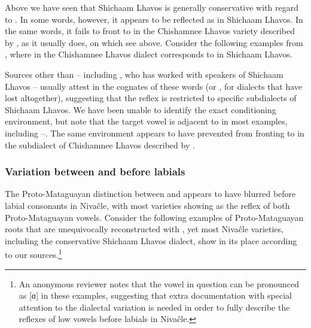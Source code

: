 Above we have seen that Shichaam Lhavos is generally conservative with regard to . In some words, however, it appears to be reflected as  in Shichaam Lhavos. In the same words, it fails to front to  in the Chishamnee Lhavos variety described by \citet{NS87}, as it usually does, on which see  above. Consider the following examples from \citep[498, 504, 514, 517, 521]{NS87}, where  in the Chishamnee Lhavos dialect corresponds to  in Shichaam Lhavos.

\ea
    \begin{xlist}
        \ex {} \recind {} \label{vatcôjôyjayash}
        \ex {} \recind {}
        \ex {} \recind {}
        \ex {} \recind {}
        \ex {} \recind {} \label{chiyô'ji}
        \ex {} \recind {}
        \ex {} \recind {}
        \ex {} \recind {}
    \end{xlist}
\z
{}

Sources other than \citet{NS87} -- including \citet{AnG15}, who has worked with speakers of Shichaam Lhavos -- usually attest  in the cognates of these words (or , for dialects that have lost  altogether), suggesting that the reflex  is restricted to specific subdialects of Shichaam Lhavos. We have been unable to identify the exact conditioning environment, but note that the target vowel is adjacent to  in most examples, including --. The same environment appears to have prevented  from fronting to  in the subdialect of Chishamnee Lhavos described by \citet{NS87}.

\subsubsection{Variation between  and  before labials}\label{ni-a-ao-labials}

The Proto-Mataguayan distinction between  and  appears to have blurred before labial consonants in Nivaĉle, with most varieties showing  as the reflex of both Proto-Mataguayan vowels. Consider the following examples of Proto-Mataguayan roots that are unequivocally reconstructed with , yet most Nivaĉle varieties, including the conservative Shichaam Lhavos dialect, show  in its place according to our sources.\footnote{An anonymous reviewer notes that the vowel in question can be pronounced as [ɑ] in these examples, suggesting that extra documentation with special attention to the dialectal variation is needed in order to fully describe the reflexes of low vowels before labials in Nivaĉle.}

